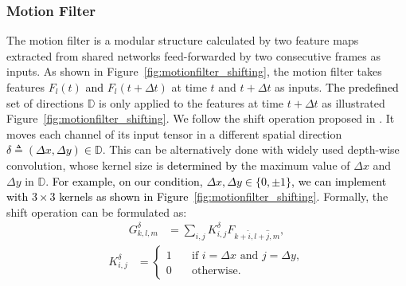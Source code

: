 \documentclass[runningheads]{llncs}
\newcommand{\nj}[1]{\textcolor{black}{#1}}
\begin{document}
\subsubsection{Motion Filter}
The motion filter is a modular structure calculated by two feature maps extracted from shared networks feed-forwarded by two consecutive frames as inputs. As shown in Figure~\ref{fig:motionfilter_shifting}, the motion filter takes features $F_l(t)$ \nj{and} $F_l(t+\Delta{t})$ at time $t$ and $t+\Delta{t}$ as inputs. \nj{The predefined} set of directions $\mathbb{D}$ is only applied to the features at time ${t+\Delta{t}}$ as illustrated Figure~\ref{fig:motionfilter_shifting}. We follow the shift operation proposed in \cite{wu2017shift}. It moves each channel of its input tensor in a different spatial direction \nj{$\delta \triangleq (\Delta{{x}}, \Delta{{y}}) \in \mathbb{D} $}. This can be alternatively done with widely used depth-wise convolution, whose kernel size is \nj{determined by} the maximum value of $\Delta{x}$ and $\Delta{y}$ in $\mathbb{D}$. \nj{For example, on our condition, $\Delta x, \Delta y \in \{0, \pm 1\}$, we can implement with $3 \times 3$ kernels as shown in Figure~\ref{fig:motionfilter_shifting}.} Formally, the shift operation can be formulated as:
\begin{align}
{G}_{k,l,m}^{\delta} & = \sum_{i,j} {K}_{i,j}^{\delta} F_{k+\hat{i},l+\hat{j},m},
\end{align}
\begin{align}
{K}_{i,j}^{\delta} & = 
  \begin{cases}
    1 & \quad \text{if } i=\Delta{x}  \text{ and }  j=\Delta{y},\\
    0 & \quad \text{otherwise.}
  \end{cases}
\end{align}
\end{document}
